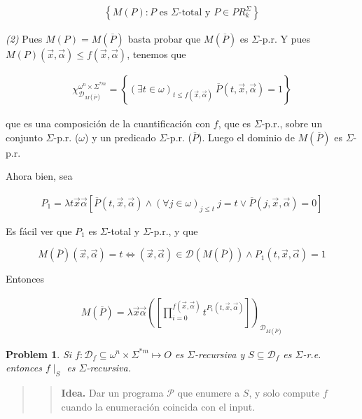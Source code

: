 \documentclass[a4paper, 12pt]{article}
\newtheorem{problem}{Problem}
\newtheorem{problem}{Problem}
\begin{document}
\begin{align*}
    \left\{ M(P) : P \text{ es $\Sigma$-total y }  P \in PR_{k}^{\Sigma} \right\} 
\end{align*}

\textit{(2)} Pues $M(P) = M(\overline{P})$ basta probar que $M(\overline{P})$ es
$\Sigma$-p.r. Y pues $M(P)(\vec{x}, \vec{\alpha}) \leq f(\vec{x}, \vec{\alpha})
$, tenemos que 

\begin{align*}
    \chi_{\mathcal{D}_{M(\overline{P})}}^{\omega^{n} \times \Sigma^{*m} } =
    \left\{ (\exists t \in \omega)_{t \leq f(\vec{x}, \vec{\alpha}) } ~
    \overline{P}(t, \vec{x}, \vec{\alpha}) = 1 \right\} 
\end{align*}

que es una composición de la cuantificación con $f$, que es $\Sigma$-p.r., sobre
un conjunto $\Sigma$-p.r. ($\omega$) y un predicado $\Sigma$-p.r.
($\overline{P}$). Luego el dominio de $M(\overline{P})$ es $\Sigma$-p.r. 

Ahora bien, sea 

\begin{align*}
    P_1 = \lambda t \vec{x}\vec{\alpha} \left[ \overline{P}(t, \vec{x},
    \vec{\alpha}) \land (\forall j \in \omega)_{j \leq t} ~j = t \lor  \overline{P}(j,
\vec{x}, \vec{\alpha}) = 0  \right]
\end{align*}

Es fácil ver que $P_1$ es $\Sigma$-total y $\Sigma$-p.r., y que 

$$M(\overline{P})(\vec{x},\vec{\alpha}) = t \iff (\vec{x}, \vec{\alpha}) \in \mathcal{D}(M(\overline{P})) \land P_1(t, \vec{x}, \vec{\alpha}) = 1$$ 

Entonces 

\begin{align*}
    M(\overline{P}) = \lambda \vec{x}\vec{\alpha}  \left( \left[
    \prod_{i=0}^{f(\vec{x}, \vec{\alpha}) } t^{P_1(t, \vec{x}, \vec{\alpha})}
\right]
\right)_{\mathcal{D}_{M(\overline{P})}}
\end{align*}

\pagebreak 

\begin{problem}
    Si $f : \mathcal{D}_f \subseteq \omega^{n} \times \Sigma^{*m} \mapsto O$ es
    $\Sigma$-recursiva y $S \subseteq \mathcal{D}_f$ es $\Sigma$-r.e. entonces
    $f\mid_S$ es $\Sigma$-recursiva.
\end{problem}

\small
\begin{quote}

\begin{quote}
    \textbf{Idea.} Dar un programa $\mathcal{P}$ que enumere a $S$, y solo
    compute $f$ cuando la enumeración coincida con el input.
\end{quote}

\end{quote}
\normalsize
\end{document}
